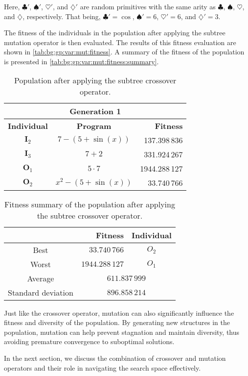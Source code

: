   Here, \(\clubsuit'\), \(\spadesuit'\), \(\heartsuit'\), and \(\diamondsuit'\)
  are random primitives with the same arity as \(\clubsuit\), \(\spadesuit\),
  \(\heartsuit\), and \(\diamondsuit\), respectively.
  That being, \(\clubsuit' = \cos\), \(\spadesuit' = 6\), \(\heartsuit' = 6\),
  and \(\diamondsuit' = 3\).

  The fitness of the individuals in the population after applying the subtree 
  mutation operator is then evaluated.
  The results of this fitness evaluation are shown in 
  \vref{tab:bg:gp:var:mut:fitness}.
  A summary of the fitness of the population is presented in 
  \vref{tab:bg:gp:var:mut:fitness:summary}.

  \begin{table}[ht!]
    \centering
    \begin{tabular}{c|c|r}
      \multicolumn{3}{c}{\textbf{Generation 1}} \\
      \hline
      \hline
      \textbf{Individual} & \textbf{Program}        & \textbf{Fitness} \\
      \hline
      \(\mathbf{I}_2\)    & \(7 - (5 + \sin(x))\)   & 137.398\,836 \\
      \(\mathbf{I}_3\)    & \(7 + 2\)               & 331.924\,267 \\
      \(\mathbf{O}_1\)    & \(5 \cdot 7\)           & 1944.288\,127 \\
      \(\mathbf{O}_2\)    & \(x^2 - (5 + \sin(x))\) & 33.740\,766
    \end{tabular}
    \caption{Population after applying the subtree crossover operator.}
    \label{tab:bg:gp:variation:crossover:subtree:fitness}
  \end{table}

  \begin{table}[H]
    \centering
    \begin{tabular}{|c|r|c|}
      \hline
            & \textbf{Fitness} & \textbf{Individual}  \\
      \hline
      Best  & \(33.740\,766\) & \(O_2\) \\
      Worst & \(1944.288\,127\) & \(O_1\) \\
      \hline
      \hline
      Average & \multicolumn{2}{c|}{\(611.837\,999\)} \\
      \hline
      Standard deviation & \multicolumn{2}{c|}{\(896.858\,214\)} \\
      \hline
    \end{tabular}
    \caption{
      Fitness summary of the population after applying the subtree crossover
      operator.
    }
    \label{tab:bg:gp:variation:crossover:subtree:fitness:summary}
  \end{table}

Just like the crossover operator, mutation can also significantly influence 
the fitness and diversity of the population. By generating new structures 
in the population, mutation can help prevent stagnation and maintain diversity, 
thus avoiding premature convergence to suboptimal solutions.

In the next section, we discuss the combination of crossover and mutation 
operators and their role in navigating the search space effectively.
